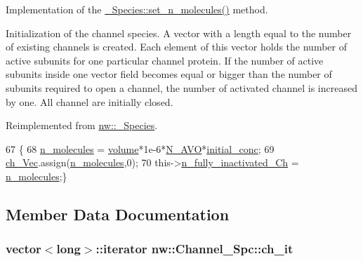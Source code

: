 Implementation of the \hyperlink{classnw_1_1___species_a53d06cca549a83bfff71303174707926}{\+\_\+\+Species\+::set\+\_\+n\+\_\+molecules()} method. 

Initialization of the channel species. A vector with a length equal to the number of existing channels is created. Each element of this vector holds the number of active subunits for one particular channel protein. If the number of active subunits inside one vector field becomes equal or bigger than the number of subunits required to open a channel, the number of activated channel is increased by one. All channel are initially closed. 

Reimplemented from \hyperlink{classnw_1_1___species_a53d06cca549a83bfff71303174707926}{nw\+::\+\_\+\+Species}.


\begin{DoxyCode}
67                                        \{
68     \hyperlink{classnw_1_1___species_af6ae0232b4f994b464a2f69cb022b33f}{n\_molecules} = \hyperlink{classnw_1_1___species_a80896a55f086f468396e76ae8f1e8285}{volume}*1e-6*\hyperlink{namespacenw_ad890cfa7dd9eaf8d5b6754723e516c4a}{N\_AVO}*\hyperlink{classnw_1_1___species_ac66cdd3bdd5be88791e00d063b4e92a2}{initial\_conc};
69     \hyperlink{classnw_1_1_channel___spc_aca3ddf4eba759eeeb835bba168795a11}{ch\_Vec}.assign(\hyperlink{classnw_1_1___species_af6ae0232b4f994b464a2f69cb022b33f}{n\_molecules},0);
70     this->\hyperlink{classnw_1_1_channel___spc_a35afc71aa0eeb5b1e4a2089a5c1f65ae}{n\_fully\_inactivated\_Ch} = \hyperlink{classnw_1_1___species_af6ae0232b4f994b464a2f69cb022b33f}{n\_molecules};\}
\end{DoxyCode}


\subsection{Member Data Documentation}
\hypertarget{classnw_1_1_channel___spc_a025013604067ea03dce585fb5a785408}{
\subsubsection[{ch\+\_\+it}]{\setlength{\rightskip}{0pt plus 5cm}vector$<$long$>$\+::iterator nw\+::\+Channel\+\_\+\+Spc\+::ch\+\_\+it\hspace{0.3cm}{\ttfamily [private]}}}\label{classnw_1_1_channel___spc_a025013604067ea03dce585fb5a785408}


